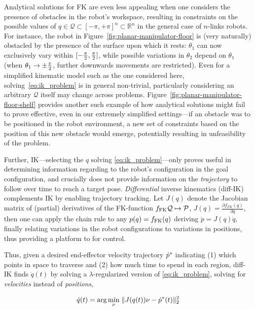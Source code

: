 Analytical solutions for FK are even less appealing when one considers the presence of obstacles in the robot's workspace, resulting in constraints on the possible values of \( q \in \mathcal Q \subset [-\pi, +\pi]^n \subset \mathbb R^n \) in the general case of \(n\)-links robots.
For instance, the robot in Figure~\ref{fig:planar-manipulator-floor} is (very naturally) obstacled by the presence of the surface upon which it rests: \( \theta_1 \) can now exclusively vary within \([-\frac{\pi}{2},  \frac{\pi}{2}] \), while possible variations in \( \theta_2 \) depend on \( \theta_1 \) (when \( \theta_1 \to \pm \frac{\pi}{2}  \), further downwards movements are restricted).
Even for a simplified kinematic model such as the one considered here, solving~\ref{eq:ik_problem} is in general non-trivial, particularly considering an arbitrary \( \mathcal Q \) itself may change across problems.
Figure~\ref{fig:planar-manipulator-floor-shelf} provides another such example of how analytical solutions might fail to prove effective, even in our extremely simplified settings---if an obstacle was to be positioned in the robot environment, a new set of constraints based on the position of this new obstacle would emerge, potentially resulting in unfeasibility of the problem.

Further, IK---selecting the \( q \) solving \ref{eq:ik_problem}---only proves useful in determining information regarding to the robot's configuration in the goal configuration, and crucially does not provide information on the \emph{trajectory} to follow over time to reach a target pose.
\emph{Differential} inverse kinematics (diff-IK) complements IK by enabling trajectory tracking. 
Let \( J(q) \) denote the Jacobian matrix of (partial) derivatives of the FK-function \( f_{\text{FK}} \mathcal Q \mapsto \mathcal P \), \( J(q) = \frac{\partial f_{FK}(q)}{\partial q } \), then one can apply the chain rule to any \( p(q) = f_{\text{FK}}(q) \) deriving \( \dot p = J(q) \dot q \), finally relating variations in the robot configurations to variations in positions, thus providing a platform to for control.

Thus, given a desired end-effector velocity trajectory \( \dot {p}^* \) indicating (1) which points in space to traverse and (2) how much time to spend in each region, diff-IK finds \( \dot q(t) \) by solving a \( \lambda \)-regularized version of \ref{eq:ik_problem}, solving for \emph{velocities} instead of \emph{positions},

\begin{align}
\dot q(t) = \arg\min_\nu \; \lVert J(q(t)) \nu - \dot {p}^* (t) \rVert_2^2
\label{eq:reg_ik_velocity}
\end{align}

